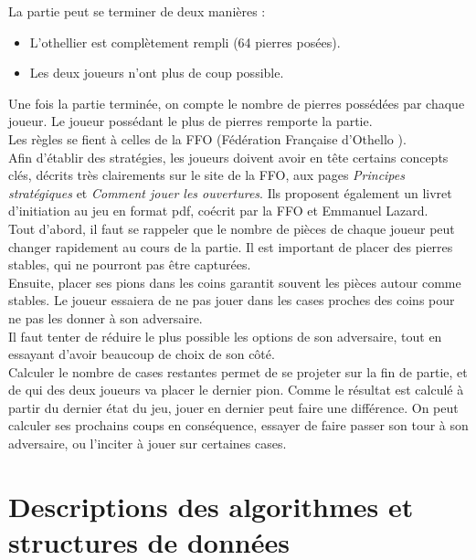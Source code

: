 \documentclass[a4paper,12pt]{article}
\begin{document}
La partie peut se terminer de deux manières :
\begin{itemize}
    \item L’othellier est complètement rempli (64 pierres posées).
    \item Les deux joueurs n’ont plus de coup possible.
\end{itemize}

\vspace{0.2cm}

Une fois la partie terminée, on compte le nombre de pierres possédées par
chaque joueur. Le joueur possédant le plus de pierres remporte la partie. \\

Les règles se fient à celles de la FFO (Fédération Française d'Othello
\cite{FFOthelloRegles}).\\

Afin d’établir des stratégies, les joueurs doivent avoir en tête certains
concepts clés, décrits très clairements sur le site de la FFO, aux pages
\textit{Principes stratégiques} et \textit{Comment jouer les ouvertures}.
\cite{FFOthelloStrategie}\cite{FFOthelloOuvertures} Ils proposent également un
livret d'initiation au jeu en format pdf, coécrit par la FFO et Emmanuel
Lazard.\cite{FFOthelloLivret}\\

Tout d’abord, il faut se rappeler que le nombre de pièces de chaque joueur peut
changer rapidement au cours de la partie. Il est important de placer des
pierres stables, qui ne pourront pas être capturées.\\ Ensuite, placer ses
pions dans les coins garantit souvent les pièces autour comme stables. Le
joueur essaiera de ne pas jouer dans les cases proches des coins pour ne pas
les donner à son adversaire.\\ Il faut tenter de réduire le plus possible les
options de son adversaire, tout en essayant d’avoir beaucoup de choix de son
côté.\\ Calculer le nombre de cases restantes permet de se projeter sur la fin
de partie, et de qui des deux joueurs va placer le dernier pion. Comme le
résultat est calculé à partir du dernier état du jeu, jouer en dernier peut
faire une différence. On peut calculer ses prochains coups en conséquence,
essayer de faire passer son tour à son adversaire, ou l’inciter à jouer sur
certaines cases.\\

\newpage

\section{Descriptions des algorithmes et structures de données}
\end{document}

